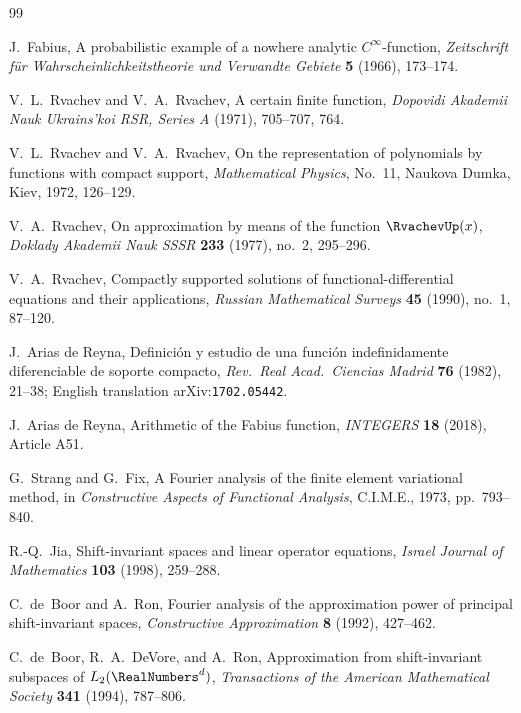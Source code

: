 \documentclass[11pt,oneside]{article}
\numberwithin{equation}{section}
\theoremstyle{definition}
\theoremstyle{remark}
\begin{document}
\begin{thebibliography}{99}

J.~Fabius,
\newblock A probabilistic example of a nowhere analytic
$C^\infty$-function,
\newblock \emph{Zeitschrift f\"ur Wahrscheinlichkeitstheorie und
Verwandte Gebiete} \textbf{5} (1966), 173--174.

V.~L.~Rvachev and V.~A.~Rvachev,
\newblock A certain finite function,
\newblock \emph{Dopovidi Akademii Nauk Ukrains'koi RSR, Series A}
(1971), 705--707, 764.

V.~L.~Rvachev and V.~A.~Rvachev,
\newblock On the representation of polynomials by functions with
compact support,
\newblock \emph{Mathematical Physics}, No.~11, Naukova Dumka, Kiev,
1972, 126--129.

V.~A.~Rvachev,
\newblock On approximation by means of the function $\RvachevUp(x)$,
\newblock \emph{Doklady Akademii Nauk SSSR} \textbf{233} (1977),
no.~2, 295--296.

V.~A.~Rvachev,
\newblock Compactly supported solutions of functional-differential
equations and their applications,
\newblock \emph{Russian Mathematical Surveys} \textbf{45} (1990),
no.~1, 87--120.

J.~Arias de Reyna,
\newblock Definici\'on y estudio de una funci\'on indefinidamente
diferenciable de soporte compacto,
\newblock \emph{Rev.\ Real Acad.\ Ciencias Madrid} \textbf{76}
(1982), 21--38; English translation arXiv:\nolinkurl{1702.05442}.

J.~Arias de Reyna,
\newblock Arithmetic of the Fabius function,
\newblock \emph{INTEGERS} \textbf{18} (2018), Article A51.

G.~Strang and G.~Fix,
\newblock A Fourier analysis of the finite element variational
method,
\newblock in \emph{Constructive Aspects of Functional Analysis},
C.I.M.E., 1973, pp.~793--840.

R.-Q.~Jia,
\newblock Shift-invariant spaces and linear operator equations,
\newblock \emph{Israel Journal of Mathematics} \textbf{103} (1998),
259--288.

C.~de~Boor and A.~Ron,
\newblock Fourier analysis of the approximation power of principal
shift-invariant spaces,
\newblock \emph{Constructive Approximation} \textbf{8} (1992),
427--462.

C.~de~Boor, R.~A.~DeVore, and A.~Ron,
\newblock Approximation from shift-invariant subspaces of
$L_2(\RealNumbers^{d})$,
\newblock \emph{Transactions of the American Mathematical Society}
\textbf{341} (1994), 787--806.


\end{thebibliography}
\end{document}
